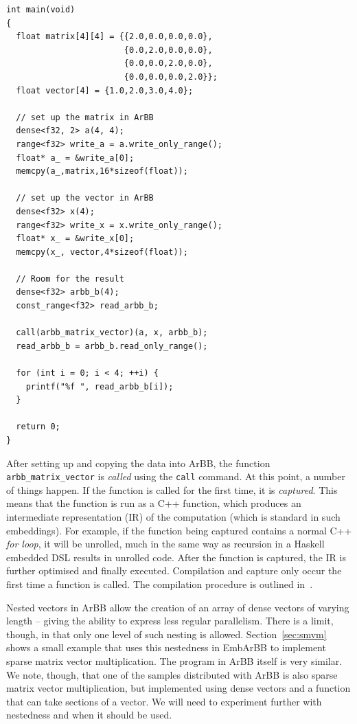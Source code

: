 \begin{Verbatim} 
int main(void)
{
  float matrix[4][4] = {{2.0,0.0,0.0,0.0},
                        {0.0,2.0,0.0,0.0},
                        {0.0,0.0,2.0,0.0},
                        {0.0,0.0,0.0,2.0}};
  float vector[4] = {1.0,2.0,3.0,4.0}; 

  // set up the matrix in ArBB 
  dense<f32, 2> a(4, 4);
  range<f32> write_a = a.write_only_range();
  float* a_ = &write_a[0];
  memcpy(a_,matrix,16*sizeof(float));

  // set up the vector in ArBB 
  dense<f32> x(4);
  range<f32> write_x = x.write_only_range();
  float* x_ = &write_x[0];
  memcpy(x_, vector,4*sizeof(float));

  // Room for the result
  dense<f32> arbb_b(4);
  const_range<f32> read_arbb_b;

  call(arbb_matrix_vector)(a, x, arbb_b);
  read_arbb_b = arbb_b.read_only_range();

  for (int i = 0; i < 4; ++i) {
    printf("%f ", read_arbb_b[i]);
  }
 
  return 0;
}
\end{Verbatim}

After setting up and copying the data into ArBB, the function {\tt arbb\_matrix\_vector} 
is {\em called} using the {\tt call} command. At this point, a number of
things happen. If the function is called for the first time, it is 
{\em captured}. This means that the function is run as a C++ function, which produces 
an intermediate representation (IR) of the computation (which is standard in such embeddings).
For example, if the function being captured contains a normal C++ {\em for loop}, it will be unrolled, much in the same way as recursion in a
Haskell embedded DSL results in unrolled code. After the function is captured, 
the IR is further optimised and finally executed. Compilation and capture 
only occur the first time a function is called. The compilation procedure
is outlined in~.

Nested vectors in ArBB allow the creation of an array of dense vectors of varying length -- giving the ability to express less regular parallelism. There is a limit, though, in that only one level of such nesting is allowed. Section~\ref{sec:smvm} shows a small example that uses this nestedness in EmbArBB to implement sparse matrix vector multiplication. The program in ArBB itself is very similar. We note, though, that one of the samples distributed with ArBB is also sparse matrix vector multiplication, but implemented using dense vectors and a function that can take sections of a vector. We will need to experiment further with nestedness and when it should be used.

